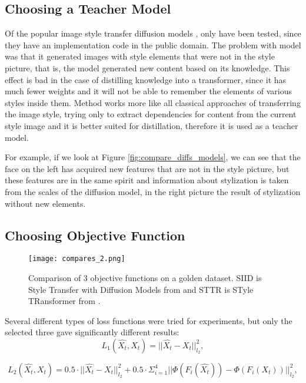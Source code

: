 \documentclass{article}
\begin{document}
\subsection{Choosing a Teacher Model}
Of the popular image style transfer diffusion models \cite{method 1,method 2, method 4}, only \cite{method 2, method 4} have been tested, since they have an implementation code in the public domain. The problem with model \cite{method 2} was that it generated images with style elements that were not in the style picture, that is, the model generated new content based on its knowledge. This effect is bad in the case of distilling knowledge into a transformer, since it has much fewer weights and it will not be able to remember the elements of various styles inside them. Method \cite{method 4} works more like all classical approaches of transferring the image style, trying only to extract dependencies for content from the current style image and it is better suited for distillation, therefore it is used as a teacher model. 

For example, if we look at Figure \ref{fig:compare_diffs_models}, we can see that the face on the left has acquired new features that are not in the style picture, but these features are in the same spirit and information about stylization is taken from the scales of the diffusion model, in the right picture the result of stylization without new elements.

\label{sec:experimetns_choosing_diff}
\subsection{Choosing Objective Function}
\label{sec:experimetns_choosing}
\begin{figure}[h]
    \centering
    \texttt{[image: compares\_2.png]}
    \caption{Comparison of 3 objective functions on a golden dataset. SIID is Style Transfer with Diffusion Models from \cite{method 4} and STTR is STyle TRansformer from \cite{method 5}.}\label{fig:compare_diffs_models_2}
\end{figure}

Several different types of loss functions were tried for experiments, but only the selected three gave significantly different results:
\begin{equation}\label{eq:l1} L_{1}(\hat{X_{t}}, X_{t}) = ||\hat{X_{t}} - X_{t} ||^2_{l_2}, \end{equation}


\begin{equation}\label{eq:l2} L_{2}(\hat{X_{t}}, X_{t}) = 0.5 \cdot||\hat{X_{t}} - X_{t} ||^2_{l_2} + 0.5 \cdot \Sigma_{i=1}^{4}||\Phi(F_{i}(\hat{X_{t}})) - \Phi(F_{i}(X_{t}))||^2_{l_2}, \end{equation}
\end{document}
